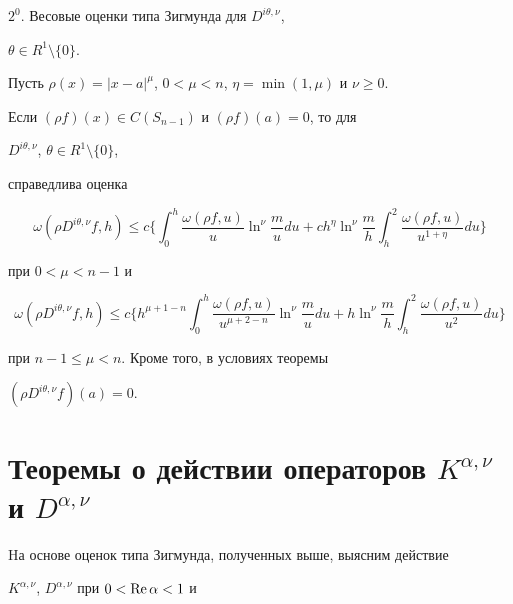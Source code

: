 ${2}^0$. Весовые оценки типа Зигмунда для $D^{i\theta,\nu}$,


$\theta \in R^1\setminus \{0\}.$





\begin{thms}


Пусть $\rho(x) = |x-a|^\mu$, $0 < \mu < n$, $\eta=\min(1,\mu)$ и $\nu\ge 0$.


Если $(\rho f)(x) \in C(S_{n-1})$ и $(\rho f)(a) = 0$, то для


$D^{i\theta,\nu}$, $\theta\in R^1\setminus \{0\}$,


справедлива оценка


$$


\omega(\rho D^{i\theta,\nu}f,h) \le c\bigg\{ \int_0^h


\frac{\omega(\rho f,u)}{u} \ln^\nu \frac{m}{u} du + ch^{\eta}


\ln^\nu \frac{m}{h} \int _h^2 \frac{\omega(\rho f,u)}{u^{1+\eta}}


du\bigg\}


$$


при $0 < \mu < n-1$ и


$$


\omega(\rho D^{i\theta,\nu}f,h) \leq c\bigg\{ h^{\mu+1-n} \int


_0^h \frac{\omega(\rho f,u)}{u^{\mu+2-n}} \ln^\nu \frac{m}{u} du +


h \ln^\nu \frac{m}{h} \int _h^2 \frac{\omega(\rho f,u)}{u^2}


du\bigg\}


$$


при $n-1 \leq \mu < n. $ Кроме того, в условиях теоремы


$(\rho D^{i\theta,\nu}f)(a) = 0$.


\end{thms}





\section{Теоремы о действии операторов $K^{\alpha,\nu}$ и $D^{\alpha,\nu}$}





Hа основе оценок типа Зигмунда, полученных выше, выясним действие


$K^{\alpha,\nu}$, $D^{\alpha,\nu}$ при $0 < \operatorname{Re} \alpha < 1$ и


